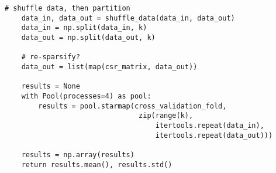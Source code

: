 \documentclass{kthreport}
\theoremstyle{definition}
\begin{document}
\begin{lstlisting}[style=MyPython, caption={Extract of the k-fold cross-validation subroutines.}, label={lst:kfoldcv}]
	# shuffle data, then partition
	data_in, data_out = shuffle_data(data_in, data_out)
	data_in = np.split(data_in, k)
	data_out = np.split(data_out, k)
	
	# re-sparsify?
	data_out = list(map(csr_matrix, data_out))
	
	results = None
	with Pool(processes=4) as pool:
		results = pool.starmap(cross_validation_fold,
                                zip(range(k),
                                    itertools.repeat(data_in),
                                    itertools.repeat(data_out)))
	
	results = np.array(results)
	return results.mean(), results.std()
\end{lstlisting}
\end{document}
